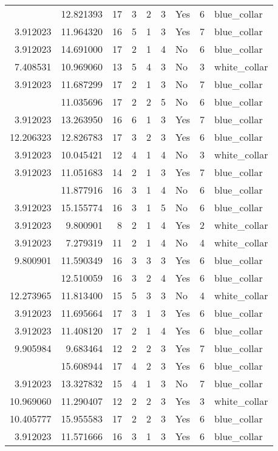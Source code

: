 \documentclass[
]{article}
\begin{document}
\begin{longtable}[t]{rrrrrllrl}
\addlinespace
11.513425 & 12.821393 & 17 & 3 & 2 & 3 & Yes & 6 & blue\_collar\\
3.912023 & 11.964320 & 16 & 5 & 1 & 3 & Yes & 7 & blue\_collar\\
3.912023 & 14.691000 & 17 & 2 & 1 & 4 & No & 6 & blue\_collar\\
7.408531 & 10.969060 & 13 & 5 & 4 & 3 & No & 3 & white\_collar\\
3.912023 & 11.687299 & 17 & 2 & 1 & 3 & No & 7 & blue\_collar\\
\addlinespace
12.611704 & 11.035696 & 17 & 2 & 2 & 5 & No & 6 & blue\_collar\\
3.912023 & 13.263950 & 16 & 6 & 1 & 3 & Yes & 7 & blue\_collar\\
12.206323 & 12.826783 & 17 & 3 & 2 & 3 & Yes & 6 & blue\_collar\\
3.912023 & 10.045421 & 12 & 4 & 1 & 4 & No & 3 & white\_collar\\
3.912023 & 11.051683 & 14 & 2 & 1 & 3 & Yes & 7 & blue\_collar\\
\addlinespace
3.912023 & 11.877916 & 16 & 3 & 1 & 4 & No & 6 & blue\_collar\\
3.912023 & 15.155774 & 16 & 3 & 1 & 5 & No & 6 & blue\_collar\\
3.912023 & 9.800901 & 8 & 2 & 1 & 4 & Yes & 2 & white\_collar\\
3.912023 & 7.279319 & 11 & 2 & 1 & 4 & No & 4 & white\_collar\\
9.800901 & 11.590349 & 16 & 3 & 3 & 3 & Yes & 6 & blue\_collar\\
\addlinespace
11.315084 & 12.510059 & 16 & 3 & 2 & 4 & Yes & 6 & blue\_collar\\
12.273965 & 11.813400 & 15 & 5 & 3 & 3 & No & 4 & white\_collar\\
3.912023 & 11.695664 & 17 & 3 & 1 & 3 & Yes & 6 & blue\_collar\\
3.912023 & 11.408120 & 17 & 2 & 1 & 4 & Yes & 6 & blue\_collar\\
9.905984 & 9.683464 & 12 & 2 & 2 & 3 & Yes & 7 & blue\_collar\\
\addlinespace
8.993427 & 15.608944 & 17 & 4 & 2 & 3 & Yes & 6 & blue\_collar\\
3.912023 & 13.327832 & 15 & 4 & 1 & 3 & No & 7 & blue\_collar\\
10.969060 & 11.290407 & 12 & 2 & 2 & 3 & Yes & 3 & white\_collar\\
10.405777 & 15.955583 & 17 & 2 & 2 & 3 & Yes & 6 & blue\_collar\\
3.912023 & 11.571666 & 16 & 3 & 1 & 3 & Yes & 6 & blue\_collar\\

\end{longtable}
\end{document}
